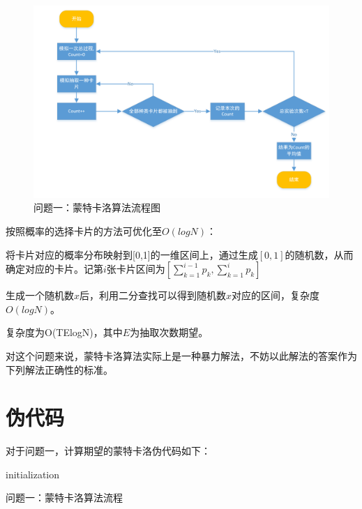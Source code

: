 \documentclass[master]{thesis-uestc}
\begin{document}
\begin{figure}[!htbp]
    \includegraphics[scale = 0.65]{pic/01.png}
    \caption{问题一：蒙特卡洛算法流程图}
    \label{13214}
    \end{figure}
    

按照概率的选择卡片的方法可优化至$O(logN)$：
    
将卡片对应的概率分布映射到[0,1]的一维区间上，通过生成$[0,1]$的随机数，从而确定对应的卡片。记第$i$张卡片区间为$[\sum\limits_{k=1}^{i-1}{p_k},\sum\limits_{k=1}^{i}{p_k}]$

生成一个随机数$x$后，利用二分查找可以得到随机数$x$对应的区间，复杂度$O(logN)$。

复杂度为O(TElogN)，其中$E$为抽取次数期望。

对这个问题来说，蒙特卡洛算法实际上是一种暴力解法，不妨以此解法的答案作为下列解法正确性的标准。

\section{伪代码}

对于问题一，计算期望的蒙特卡洛伪代码如下：

\begin{algorithm}[H]
 initialization\;
 \caption{问题一：蒙特卡洛算法流程}
\end{algorithm}
\end{document}
